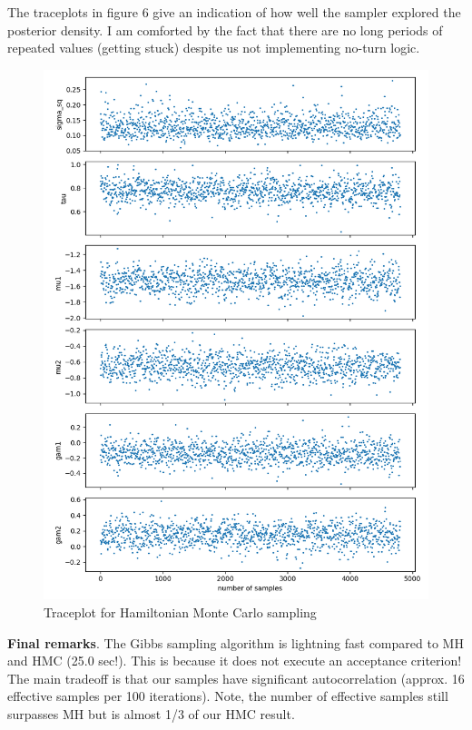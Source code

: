 \documentclass[12pt,letterpaper,twoside]{article}
\begin{document}
The traceplots in figure 6 give an indication of how well the sampler 
explored the posterior density. I am comforted by the fact that 
there are no long periods of repeated values (getting stuck) 
despite us not implementing no-turn logic. 
\begin{figure}[H]
    \centering
    \includegraphics[scale=0.7]{gibbs_sampled_traceplot.png}
    \caption{Traceplot for Hamiltonian Monte Carlo sampling}
\end{figure}

\textbf{Final remarks}. The Gibbs sampling algorithm is lightning 
fast compared to MH and HMC (25.0 sec!). This is because it does 
not execute an acceptance criterion! The main tradeoff is that our 
samples have significant autocorrelation (approx. 16 effective 
samples per 100 iterations). Note, the number of effective samples 
still surpasses MH but is almost 1/3 of our HMC result.
\end{document}

